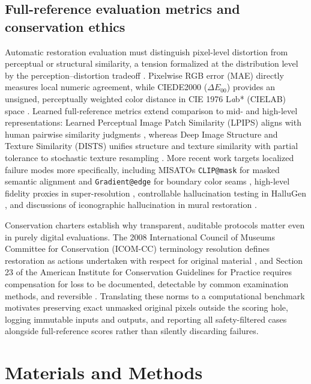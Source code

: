 \documentclass[applsci,article,submit,pdftex,moreauthors]{Definitions/mdpi}
\begin{document}
\subsection{Full-reference evaluation metrics and conservation ethics}\label{full-reference-evaluation-metrics-and-conservation-ethics}

Automatic restoration evaluation must distinguish pixel-level distortion from perceptual or structural similarity, a tension formalized at the distribution level by the perception--distortion tradeoff \citep{blau2018}. Pixelwise RGB error (MAE) directly measures local numeric agreement, while CIEDE2000 (\texttt{\ensuremath{\Delta E_{00}}}) provides an unsigned, perceptually weighted color distance in CIE 1976 L\emph{a}b* (CIELAB) space \citep{luo2001ciede2000, sharma2005ciede2000}. Learned full-reference metrics extend comparison to mid- and high-level representations: Learned Perceptual Image Patch Similarity (LPIPS) aligns with human pairwise similarity judgments \citep{zhang2018lpips}, whereas Deep Image Structure and Texture Similarity (DISTS) unifies structure and texture similarity with partial tolerance to stochastic texture resampling \citep{ding2020dists}. More recent work targets localized failure modes more specifically, including MISATO\textquotesingle s \texttt{CLIP@mask} for masked semantic alignment and \texttt{Gradient@edge} for boundary color seams \citep{wang2025misato}, high-level fidelity proxies in super-resolution \citep{rocafort2025}, controllable hallucination testing in HalluGen \citep{kim2026hallugen}, and discussions of iconographic hallucination in mural restoration \citep{ren2026mapgr}.

Conservation charters establish why transparent, auditable protocols matter even in purely digital evaluations. The 2008 International Council of Museums Committee for Conservation (ICOM-CC) terminology resolution defines restoration as actions undertaken with respect for original material \citep{icomcc2008}, and Section 23 of the American Institute for Conservation Guidelines for Practice requires compensation for loss to be documented, detectable by common examination methods, and reversible \citep{aic1994}. Translating these norms to a computational benchmark motivates preserving exact unmasked original pixels outside the scoring hole, logging immutable inputs and outputs, and reporting all safety-filtered cases alongside full-reference scores rather than silently discarding failures.

\section{Materials and Methods}\label{materials-and-methods}
\end{document}
